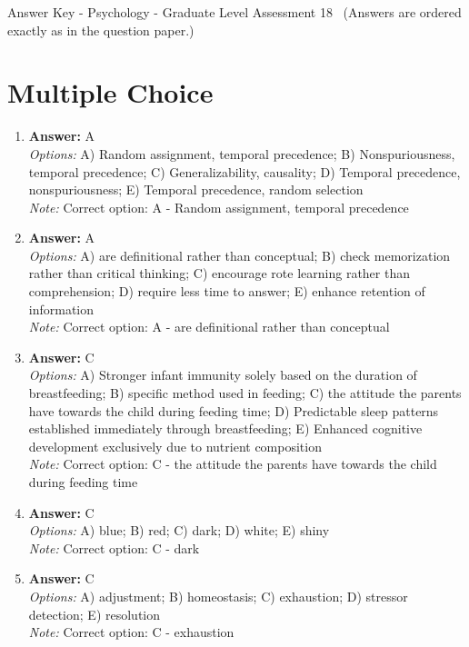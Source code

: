 \documentclass[12pt]{article}
\begin{document}
\begin{center}
Answer Key - Psychology - Graduate Level Assessment 18 \
\small (Answers are ordered exactly as in the question paper.)
\end{center}

\section*{Multiple Choice}
\begin{enumerate}[label=\arabic*.]
\item \textbf{Answer:} A
\\ \textit{Options:} A) Random assignment, temporal precedence; B) Nonspuriousness, temporal precedence; C) Generalizability, causality; D) Temporal precedence, nonspuriousness; E) Temporal precedence, random selection
\\ \textit{Note:} Correct option: A - Random assignment, temporal precedence
\item \textbf{Answer:} A
\\ \textit{Options:} A) are definitional rather than conceptual; B) check memorization rather than critical thinking; C) encourage rote learning rather than comprehension; D) require less time to answer; E) enhance retention of information
\\ \textit{Note:} Correct option: A - are definitional rather than conceptual
\item \textbf{Answer:} C
\\ \textit{Options:} A) Stronger infant immunity solely based on the duration of breastfeeding; B) specific method used in feeding; C) the attitude the parents have towards the child during feeding time; D) Predictable sleep patterns established immediately through breastfeeding; E) Enhanced cognitive development exclusively due to nutrient composition
\\ \textit{Note:} Correct option: C - the attitude the parents have towards the child during feeding time
\item \textbf{Answer:} C
\\ \textit{Options:} A) blue; B) red; C) dark; D) white; E) shiny
\\ \textit{Note:} Correct option: C - dark
\item \textbf{Answer:} C
\\ \textit{Options:} A) adjustment; B) homeostasis; C) exhaustion; D) stressor detection; E) resolution
\\ \textit{Note:} Correct option: C - exhaustion
\end{enumerate}
\end{document}
